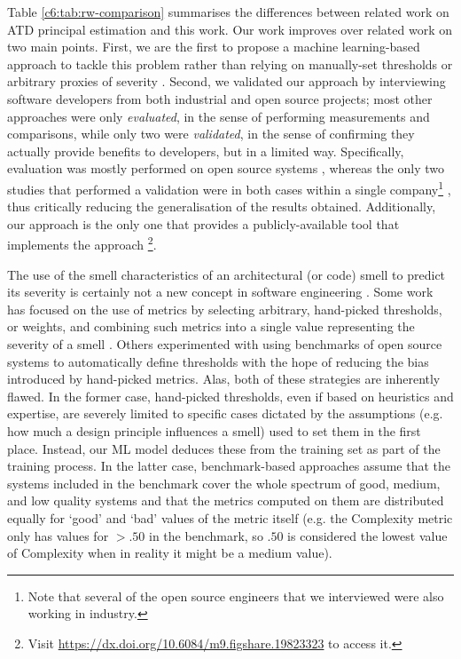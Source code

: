 Table \ref{c6:tab:rw-comparison} summarises the differences between related work on ATD principal estimation and this work. 
Our work improves over related work on two main points.
First, we are the first to propose a machine learning-based approach to tackle this problem rather than relying on manually-set thresholds \cite{Wu2018,Martini2018b} or arbitrary proxies of severity \cite{Roveda2018}.
Second, we validated our approach by interviewing software developers from both industrial and open source projects; most other approaches were only \emph{evaluated}, in the sense of performing measurements and comparisons, while only two were \emph{validated}, in the sense of confirming they actually provide benefits to developers, but in a limited way.
Specifically, evaluation was mostly performed on open source systems \cite{Xiao2016,Roveda2018,Verdecchia2020}, whereas the only two studies that performed a validation were in both cases within a single company\footnote{Note that several of the open source engineers that we interviewed were also working in industry.} \cite{Martini2018b,Wu2018}, thus critically reducing the generalisation of the results obtained. 
Additionally, our approach is the only one that provides a publicly-available tool that implements the approach \footnote{Visit \url{https://dx.doi.org/10.6084/m9.figshare.19823323} to access it.}.

The use of the smell characteristics of an architectural (or code) smell to predict its severity is certainly not a new concept in software engineering \cite{Laval2012,Tsantalis2011,Arcelli2015b,Vidal2016,Roveda2018}.
Some work has focused on the use of metrics by selecting arbitrary, hand-picked thresholds, or weights, and combining such metrics into a single value representing the severity of a smell \cite{Laval2012,Vidal2016}.
Others experimented with using benchmarks of open source systems to automatically define thresholds \cite{Arcelli2015b} with the hope of reducing the bias introduced by hand-picked metrics. 
Alas, both of these strategies are inherently flawed. In the former case, hand-picked thresholds, even if based on heuristics and expertise, are severely limited to specific cases dictated by the assumptions (e.g. how much a design principle influences a smell) used to set them in the first place.
Instead, our ML model deduces these from the training set as part of the training process.
In the latter case, benchmark-based approaches assume that the systems included in the benchmark cover the whole spectrum of good, medium, and low quality systems and that the metrics computed on them are distributed equally for `good' and `bad' values of the metric itself (e.g. the Complexity metric only has values for $>.50$ in the benchmark, so $.50$ is considered the lowest value of Complexity when in reality it might be a medium value).

